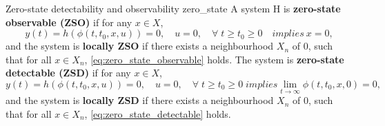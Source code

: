 \begin{definition}[list text=Zero-state detectability and observability]{Zero-state detectability and observability \cite{baoProcessControlPassive2007}}{zero_state}
  A system H is \textbf{zero-state observable (ZSO)} if for any $x \in X$,
  \begin{equation} \label{eq:zero_state_observable}
    y\left(t\right) = h\left(\phi\left(t, t_0, x, u \right)\right) = 0, \quad u = 0, \quad \forall \; t \geq t_0 \geq 0 \quad implies \ x = 0,
  \end{equation}
  and the system is \textbf{locally ZSO} if there exists a neighbourhood $X_n$ of $0$, such that for all $x \in X_n$, \eqref{eq:zero_state_observable} holds. The system is \textbf{zero-state detectable (ZSD)} if for any $x \in X$,
  \begin{equation} \label{eq:zero_state_detectable}
    y\left(t\right) = h\left(\phi\left(t, t_0, x, u\right)\right) = 0, \quad u = 0, \quad \forall \; t \geq t_0 \geq 0 \; implies \lim_{t \rightarrow\infty}{\phi \left(t, t_0, x, 0\right) = 0},
  \end{equation}
  and the system is \textbf{locally ZSD} if there exists a neighbourhood $X_n$ of $0$, such that for all $x \in X_n$, \eqref{eq:zero_state_detectable} holds.
\end{definition}

